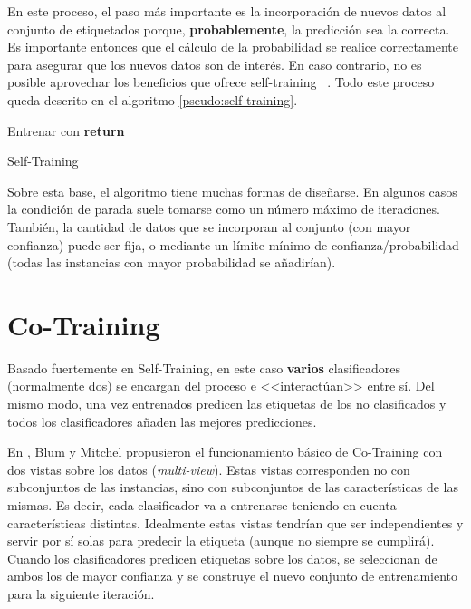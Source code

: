 En este proceso, el paso más importante es la incorporación de nuevos datos al
conjunto de etiquetados porque, \textbf{probablemente}, la predicción sea la
correcta. Es importante entonces que el cálculo de la probabilidad se realice
correctamente para asegurar que los nuevos datos son de interés. En caso
contrario, no es posible aprovechar los beneficios que ofrece self-training~
\cite{vanEngelen2020}. Todo este proceso queda descrito en el algoritmo
\ref{pseudo:self-training}.

\begin{algorithm}
    \DontPrintSemicolon
     Entrenar  con \;
     \textbf{return} 
     \caption{Self-Training}\label{pseudo:self-training}
\end{algorithm}

Sobre esta base, el algoritmo tiene muchas formas de diseñarse. En algunos casos
la condición de parada suele tomarse como un número máximo de iteraciones.
También, la cantidad de datos que se incorporan al conjunto 
(con mayor confianza) puede ser fija, o mediante un límite mínimo de
confianza/probabilidad (todas las instancias con mayor probabilidad se
añadirían).

\section{Co-Training}
Basado fuertemente en Self-Training, en este caso \textbf{varios} clasificadores
(normalmente dos) se encargan del proceso e <<interactúan>> entre sí. Del mismo
modo, una vez entrenados predicen las etiquetas de los no clasificados y todos
los clasificadores añaden las mejores predicciones.

En \cite{blum1998combining}, Blum y Mitchel propusieron el funcionamiento básico
de Co-Training con dos vistas sobre los datos (\emph{multi-view}). Estas vistas
corresponden no con subconjuntos de las instancias, sino con subconjuntos de las
características de las mismas. Es decir, cada clasificador va a entrenarse
teniendo en cuenta características distintas. Idealmente estas vistas tendrían
que ser independientes y servir por sí solas para predecir la etiqueta (aunque
no siempre se cumplirá). Cuando los clasificadores predicen etiquetas sobre los
datos, se seleccionan de ambos los de mayor confianza y se construye el nuevo
conjunto de entrenamiento para la siguiente iteración.


